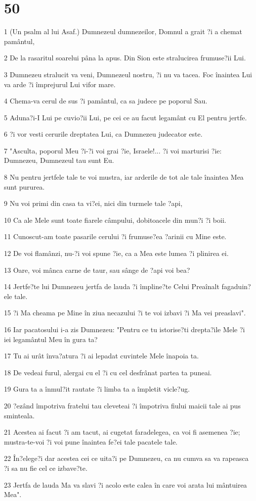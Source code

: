 \chapter{50}

\par 1 (Un psalm al lui Asaf.) Dumnezeul dumnezeilor, Domnul a grait ?i a chemat pamântul,
\par 2 De la rasaritul soarelui pâna la apus. Din Sion este stralucirea frumuse?ii Lui.
\par 3 Dumnezeu stralucit va veni, Dumnezeul nostru, ?i nu va tacea. Foc înaintea Lui va arde ?i împrejurul Lui vifor mare.
\par 4 Chema-va cerul de sus ?i pamântul, ca sa judece pe poporul Sau.
\par 5 Aduna?i-I Lui pe cuvio?ii Lui, pe cei ce au facut legamânt cu El pentru jertfe.
\par 6 ?i vor vesti cerurile dreptatea Lui, ca Dumnezeu judecator este.
\par 7 "Asculta, poporul Meu ?i-?i voi grai ?ie, Israele!... ?i voi marturisi ?ie: Dumnezeu, Dumnezeul tau sunt Eu.
\par 8 Nu pentru jertfele tale te voi mustra, iar arderile de tot ale tale înaintea Mea sunt pururea.
\par 9 Nu voi primi din casa ta vi?ei, nici din turmele tale ?api,
\par 10 Ca ale Mele sunt toate fiarele câmpului, dobitoacele din mun?i ?i boii.
\par 11 Cunoscut-am toate pasarile cerului ?i frumuse?ea ?arinii cu Mine este.
\par 12 De voi flamânzi, nu-?i voi spune ?ie, ca a Mea este lumea ?i plinirea ei.
\par 13 Oare, voi mânca carne de taur, sau sânge de ?api voi bea?
\par 14 Jertfe?te lui Dumnezeu jertfa de lauda ?i împline?te Celui Preaînalt fagaduin?ele tale.
\par 15 ?i Ma cheama pe Mine în ziua necazului ?i te voi izbavi ?i Ma vei preaslavi".
\par 16 Iar pacatosului i-a zis Dumnezeu: "Pentru ce tu istorise?ti drepta?ile Mele ?i iei legamântul Meu în gura ta?
\par 17 Tu ai urât înva?atura ?i ai lepadat cuvintele Mele înapoia ta.
\par 18 De vedeai furul, alergai cu el ?i cu cel desfrânat partea ta puneai.
\par 19 Gura ta a înmul?it rautate ?i limba ta a împletit vicle?ug.
\par 20 ?ezând împotriva fratelui tau cleveteai ?i împotriva fiului maicii tale ai pus sminteala.
\par 21 Acestea ai facut ?i am tacut, ai cugetat faradelegea, ca voi fi asemenea ?ie; mustra-te-voi ?i voi pune înaintea fe?ei tale pacatele tale.
\par 22 În?elege?i dar acestea cei ce uita?i pe Dumnezeu, ca nu cumva sa va rapeasca ?i sa nu fie cel ce izbave?te.
\par 23 Jertfa de lauda Ma va slavi ?i acolo este calea în care voi arata lui mântuirea Mea".

